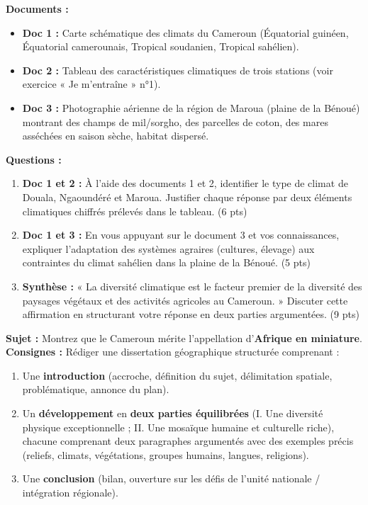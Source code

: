 \documentclass[11pt]{article}
\begin{document}
\begin{exercice}
\textbf{Documents :}
\begin{itemize}
\item \textbf{Doc 1 :} Carte schématique des climats du Cameroun (Équatorial guinéen, Équatorial camerounais, Tropical soudanien, Tropical sahélien).
\item \textbf{Doc 2 :} Tableau des caractéristiques climatiques de trois stations (voir exercice « Je m'entraîne » n°1).
\item \textbf{Doc 3 :} Photographie aérienne de la région de Maroua (plaine de la Bénoué) montrant des champs de mil/sorgho, des parcelles de coton, des mares asséchées en saison sèche, habitat dispersé.
\end{itemize}
\textbf{Questions :}
\begin{enumerate}
\item \textbf{Doc 1 et 2 :} À l'aide des documents 1 et 2, identifier le type de climat de Douala, Ngaoundéré et Maroua. Justifier chaque réponse par deux éléments climatiques chiffrés prélevés dans le tableau. (6 pts)
\item \textbf{Doc 1 et 3 :} En vous appuyant sur le document 3 et vos connaissances, expliquer l'adaptation des systèmes agraires (cultures, élevage) aux contraintes du climat sahélien dans la plaine de la Bénoué. (5 pts)
\item \textbf{Synthèse :} « La diversité climatique est le facteur premier de la diversité des paysages végétaux et des activités agricoles au Cameroun. » Discuter cette affirmation en structurant votre réponse en deux parties argumentées. (9 pts)
\end{enumerate}
\end{exercice}

\begin{exercice}
\textbf{Sujet :} \og Montrez que le Cameroun mérite l'appellation d'\textbf{Afrique en miniature}.\fg
\textbf{Consignes :} Rédiger une dissertation géographique structurée comprenant :
\begin{enumerate}
\item Une \textbf{introduction} (accroche, définition du sujet, délimitation spatiale, problématique, annonce du plan).
\item Un \textbf{développement} en \textbf{deux parties équilibrées} (I. Une diversité physique exceptionnelle ; II. Une mosaïque humaine et culturelle riche), chacune comprenant deux paragraphes argumentés avec des exemples précis (reliefs, climats, végétations, groupes humains, langues, religions).
\item Une \textbf{conclusion} (bilan, ouverture sur les défis de l'unité nationale / intégration régionale).
\end{enumerate}
\end{exercice}
\end{document}
